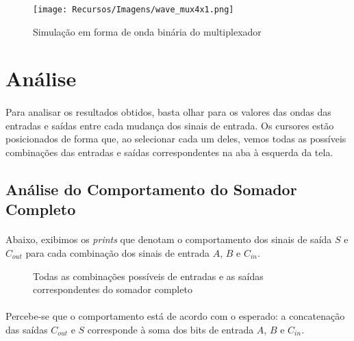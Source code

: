 \documentclass[a4paper,12pt]{article}
\begin{document}
\begin{figure}[H]
    \centering
    \begin{tcolorbox}[colframe=cinza, colback=white, boxrule=0.75pt, arc=0pt, width=1\textwidth, center, boxsep=0pt, left=0pt, right=0pt, top=0pt, bottom=0pt]
    \texttt{[image: Recursos/Imagens/wave\_mux4x1.png]}
    \end{tcolorbox}
    \caption{Simulação em forma de onda binária do multiplexador}
\end{figure}

\section{Análise}

\paragraph{}
Para analisar os resultados obtidos, basta olhar para os valores das ondas das entradas e saídas entre cada mudança dos sinais de entrada. Os cursores estão posicionados de forma que, ao selecionar cada um deles, vemos todas as possíveis combinações das entradas e saídas correspondentes na aba à esquerda da tela.

\subsection{Análise do Comportamento do Somador Completo}
\paragraph{}
 Abaixo, exibimos os \textit{prints} que denotam o comportamento dos sinais de saída $S$ e $C_{out}$ para cada combinação dos sinais de entrada $A$, $B$ e $C_{in}$.

\begin{figure}[H]
    \centering
    
    \caption{Todas as combinações possíveis de entradas e as saídas correspondentes do somador completo}
\end{figure}

\paragraph{}
Percebe-se que o comportamento está de acordo com o esperado: a concatenação das saídas $C_{out}$ e $S$ corresponde à soma dos bits de entrada $A$, $B$ e $C_{in}$.
\end{document}
